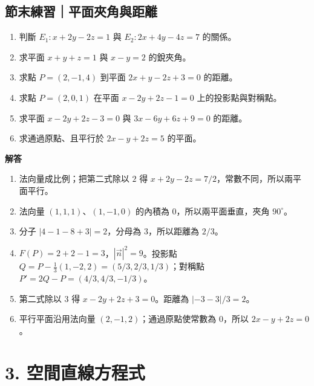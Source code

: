 \documentclass[11pt,a4paper]{article}
\providecommand{\tightlist}{%
  \setlength{\itemsep}{0pt}\setlength{\parskip}{0pt}}
\begin{document}
\begin{HandoutSelfCheck}

\subsection{節末練習｜平面夾角與距離}\label{ux7bc0ux672bux7df4ux7fd2ux5e73ux9762ux593eux89d2ux8207ux8dddux96e2}

\begin{enumerate}
\def\labelenumi{\arabic{enumi}.}
\tightlist
\item
  判斷 \(E_1:x+2y-2z=1\) 與 \(E_2:2x+4y-4z=7\) 的關係。
\item
  求平面 \(x+y+z=1\) 與 \(x-y=2\) 的銳夾角。
\item
  求點 \(P=(2,-1,4)\) 到平面 \(2x+y-2z+3=0\) 的距離。
\item
  求點 \(P=(2,0,1)\) 在平面 \(x-2y+2z-1=0\) 上的投影點與對稱點。
\item
  求平面 \(x-2y+2z-3=0\) 與 \(3x-6y+6z+9=0\) 的距離。
\item
  求通過原點、且平行於 \(2x-y+2z=5\) 的平面。
\end{enumerate}

\textbf{解答}

\begin{enumerate}
\def\labelenumi{\arabic{enumi}.}
\tightlist
\item
  法向量成比例；把第二式除以 \(2\) 得 \(x+2y-2z=7/2\)，常數不同，所以兩平面平行。
\item
  法向量 \((1,1,1)\)、\((1,-1,0)\) 的內積為 \(0\)，所以兩平面垂直，夾角 \(90^\circ\)。
\item
  分子 \(|4-1-8+3|=2\)，分母為 \(3\)，所以距離為 \(\boxed{2/3}\)。
\item
  \(F(P)=2+2-1=3\)，\(|\vec n|^2=9\)。投影點 \(Q=P-\tfrac13(1,-2,2)=(5/3,2/3,1/3)\)；對稱點 \(P'=2Q-P=(4/3,4/3,-1/3)\)。
\item
  第二式除以 \(3\) 得 \(x-2y+2z+3=0\)。距離為 \(|{-3}-3|/3=\boxed2\)。
\item
  平行平面沿用法向量 \((2,-1,2)\)；通過原點使常數為 \(0\)，所以 \(\boxed{2x-y+2z=0}\)。
\end{enumerate}

\end{HandoutSelfCheck}

\section{3. 空間直線方程式}\label{ux7a7aux9593ux76f4ux7ddaux65b9ux7a0bux5f0f}
\end{document}
